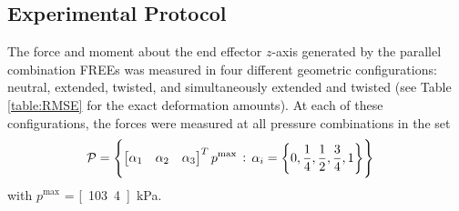 

\subsection{Experimental Protocol}
The force and moment about the end effector $z$-axis generated by the parallel combination FREEs was measured in four different geometric configurations: neutral, extended, twisted, and simultaneously extended and twisted (see Table \ref{table:RMSE} for the exact deformation amounts). 
At each of these configurations, the forces were measured at all pressure combinations in the set
\begin{align}
    \mathcal{P} &= \left\{ \begin{bmatrix} \alpha_1 & \alpha_2 & \alpha_3 \end{bmatrix}^T p^{\text{max}} \, : \, \alpha_i = \left\{ 0, \frac{1}{4}, \frac{1}{2}, \frac{3}{4}, 1 \right\} \right\}
\end{align}
with $p^{\text{max}}$ = \unit[103.4]{kPa}. 



